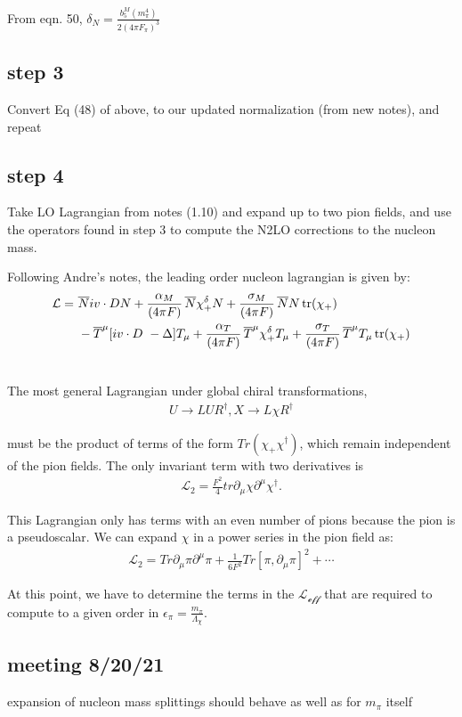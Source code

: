 \documentclass[12pt,tightenlines, raggedbottom, prd, notitlepage]{revtex4-1}
\def\mc#1{{\mathcal #1}}
\def\ol{\overline}
\begin{document}
From eqn. 50, $\delta_N = \frac{b^M_5(m^4_\pi)}{2(4\pi F_\pi)^3}$

\subsection*{step 3}
Convert Eq (48) of above, to our updated normalization (from new notes), and repeat

\subsection*{step 4}
Take LO Lagrangian from notes (1.10) and expand up to two pion fields, 
and use the operators found in step 3 to compute the N2LO corrections to the nucleon mass.

Following Andre's notes, the leading order nucleon lagrangian is given by: 
\begin{align*}
  \mc{L} =&\ 
    \ol{N} iv \cdot D N 
    +\frac{\alpha_M}{(4\pi F)}\,\ol{N} \chi^\delta_+ N
    +\frac{\sigma_M}{(4\pi F)}\,\ol{N} N \,{\rm tr}(\chi_+) 
  \nonumber\\&\ 
    - \ol{T}^\mu[iv \cdot D\ - \Delta]T_\mu 
    +\frac{\alpha_T}{(4\pi F)}\,\overline{T}^\mu \chi_+^\delta T_\mu
    +\frac{{\sigma}_T}{(4\pi F)}\,\ol{T}^\mu T_\mu\,{\rm tr}(\chi_+)  
  \nonumber\\&\ 
\end{align*}

The most general Lagrangian under global chiral transformations, 
\begin{align*}
  U \rightarrow LUR^\dagger, X \rightarrow L\chi R^\dagger
\end{align*}

must be the product of terms of the form $Tr(\chi_+\chi^\dagger)$, which remain independent of the pion fields. 
The only invariant term with two derivatives is 
\begin{align*}
  \mathcal{L}_2 = \frac{F^2}{4}tr \partial_\mu \chi \partial^\mu \chi^\dagger.
\end{align*}

This Lagrangian only has terms with an even number of pions because the pion is a pseudoscalar. We can expand $\chi$ in a power series in the pion field as:
\begin{align*}
  \mathcal{L}_2 = Tr \partial_\mu \pi \partial^\mu \pi + \frac{1}{6F^2}Tr[\pi, \partial_\mu \pi]^2 + \dotsm
\end{align*}


At this point, we have to determine the terms in the $\mathcal{L_{eff}}$ that are required to compute to a given order
in $\epsilon_\pi = \frac{m_\pi}{\Lambda_\chi}$. 











\subsection*{meeting 8/20/21}
expansion of nucleon mass splittings should behave as well as for $m_\pi$ itself
\end{document}
